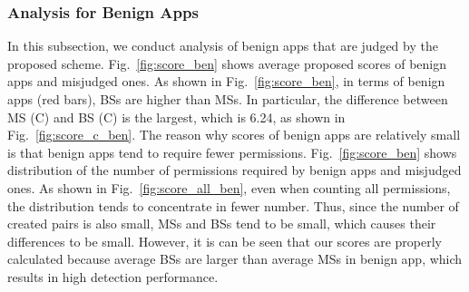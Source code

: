 \documentclass{ieeeaccess}
\newcommand{\myfigurename}{Fig.}
\begin{document}




\subsubsection{Analysis for Benign Apps} \label{subsec:analysis_benign}
In this subsection, we conduct analysis of benign apps that are judged by the proposed scheme.
\myfigurename~\ref{fig:score_ben} shows average proposed scores of benign apps and misjudged ones.
As shown in \myfigurename~\ref{fig:score_ben}, in terms of benign apps (red bars), BSs are higher than MSs.
In particular, the difference between MS (C) and BS (C) is the largest, which is 6.24, as shown in \myfigurename~\ref{fig:score_c_ben}.
The reason why scores of benign apps are relatively small is that benign apps tend to require fewer permissions.
\myfigurename~\ref{fig:score_ben} shows distribution of the number of permissions required by benign apps and misjudged ones.
As shown in \myfigurename~\ref{fig:score_all_ben}, even when counting all permissions, the distribution tends to concentrate in fewer number.
Thus, since the number of created pairs is also small, MSs and BSs tend to be small, which causes their differences to be small.
However, it is can be seen that our scores are properly calculated because average BSs are larger than average MSs in benign app, which results in high detection performance.
\end{document}
